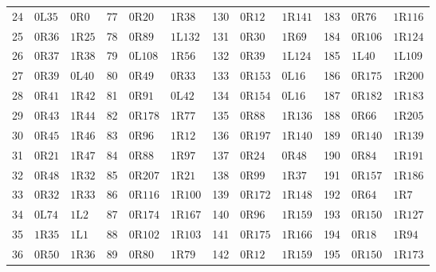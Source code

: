 \begin{longtable}{@{}rll@{\quad}rll@{\quad}rll@{\quad}rll@{}}
24 & $0\mathrm{L}35$ & $0\mathrm{R}0$ & 77 & $0\mathrm{R}20$ & $1\mathrm{R}38$ & 130 & $0\mathrm{R}12$ & $1\mathrm{R}141$ & 183 & $0\mathrm{R}76$ & $1\mathrm{R}116$\\
25 & $0\mathrm{R}36$ & $1\mathrm{R}25$ & 78 & $0\mathrm{R}89$ & $1\mathrm{L}132$ & 131 & $0\mathrm{R}30$ & $1\mathrm{R}69$ & 184 & $0\mathrm{R}106$ & $1\mathrm{R}124$\\
26 & $0\mathrm{R}37$ & $1\mathrm{R}38$ & 79 & $0\mathrm{L}108$ & $1\mathrm{R}56$ & 132 & $0\mathrm{R}39$ & $1\mathrm{L}124$ & 185 & $1\mathrm{L}40$ & $1\mathrm{L}109$\\
27 & $0\mathrm{R}39$ & $0\mathrm{L}40$ & 80 & $0\mathrm{R}49$ & $0\mathrm{R}33$ & 133 & $0\mathrm{R}153$ & $0\mathrm{L}16$ & 186 & $0\mathrm{R}175$ & $1\mathrm{R}200$\\
28 & $0\mathrm{R}41$ & $1\mathrm{R}42$ & 81 & $0\mathrm{R}91$ & $0\mathrm{L}42$ & 134 & $0\mathrm{R}154$ & $0\mathrm{L}16$ & 187 & $0\mathrm{R}182$ & $1\mathrm{R}183$\\
29 & $0\mathrm{R}43$ & $1\mathrm{R}44$ & 82 & $0\mathrm{R}178$ & $1\mathrm{R}77$ & 135 & $0\mathrm{R}88$ & $1\mathrm{R}136$ & 188 & $0\mathrm{R}66$ & $1\mathrm{R}205$\\
30 & $0\mathrm{R}45$ & $1\mathrm{R}46$ & 83 & $0\mathrm{R}96$ & $1\mathrm{R}12$ & 136 & $0\mathrm{R}197$ & $1\mathrm{R}140$ & 189 & $0\mathrm{R}140$ & $1\mathrm{R}139$\\
31 & $0\mathrm{R}21$ & $1\mathrm{R}47$ & 84 & $0\mathrm{R}88$ & $1\mathrm{R}97$ & 137 & $0\mathrm{R}24$ & $0\mathrm{R}48$ & 190 & $0\mathrm{R}84$ & $1\mathrm{R}191$\\
32 & $0\mathrm{R}48$ & $1\mathrm{R}32$ & 85 & $0\mathrm{R}207$ & $1\mathrm{R}21$ & 138 & $0\mathrm{R}99$ & $1\mathrm{R}37$ & 191 & $0\mathrm{R}157$ & $1\mathrm{R}186$\\
33 & $0\mathrm{R}32$ & $1\mathrm{R}33$ & 86 & $0\mathrm{R}116$ & $1\mathrm{R}100$ & 139 & $0\mathrm{R}172$ & $1\mathrm{R}148$ & 192 & $0\mathrm{R}64$ & $1\mathrm{R}7$\\
34 & $0\mathrm{L}74$ & $1\mathrm{L}2$ & 87 & $0\mathrm{R}174$ & $1\mathrm{R}167$ & 140 & $0\mathrm{R}96$ & $1\mathrm{R}159$ & 193 & $0\mathrm{R}150$ & $1\mathrm{R}127$\\
35 & $1\mathrm{R}35$ & $1\mathrm{L}1$ & 88 & $0\mathrm{R}102$ & $1\mathrm{R}103$ & 141 & $0\mathrm{R}175$ & $1\mathrm{R}166$ & 194 & $0\mathrm{R}18$ & $1\mathrm{R}94$\\
36 & $0\mathrm{R}50$ & $1\mathrm{R}36$ & 89 & $0\mathrm{R}80$ & $1\mathrm{R}79$ & 142 & $0\mathrm{R}12$ & $1\mathrm{R}159$ & 195 & $0\mathrm{R}150$ & $1\mathrm{R}173$\\

\end{longtable}
